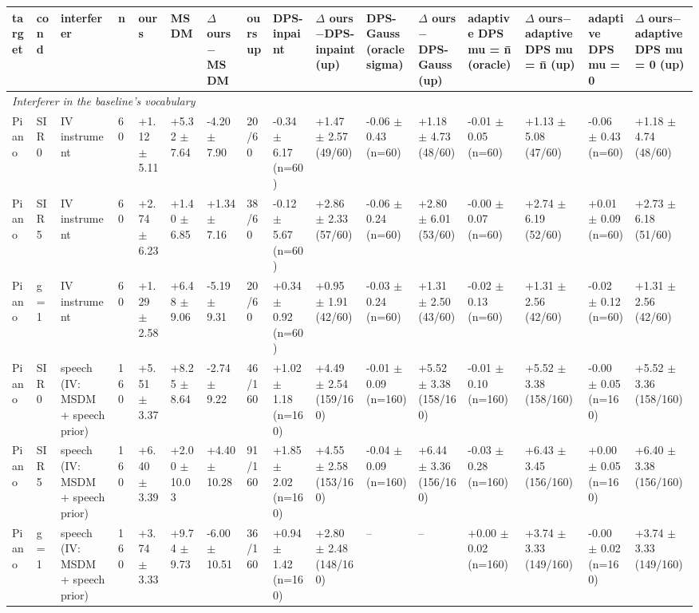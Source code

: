 \begin{tabular}{llllllllllllllll}
\toprule
target & cond & interferer & n & ours & MSDM & $\Delta$ ours$-$MSDM & ours up & DPS-inpaint & $\Delta$ ours$-$DPS-inpaint (up) & DPS-Gauss (oracle sigma) & $\Delta$ ours$-$DPS-Gauss (up) & adaptive DPS mu = n̄ (oracle) & $\Delta$ ours$-$adaptive DPS mu = n̄ (up) & adaptive DPS mu = 0 & $\Delta$ ours$-$adaptive DPS mu = 0 (up)\\
\midrule
\multicolumn{16}{l}{\emph{Interferer in the baseline's vocabulary}}\\
Piano & SIR 0 & IV instrument & 60 & +1.12 $\pm$ 5.11 & +5.32 $\pm$ 7.64 & -4.20 $\pm$ 7.90 & 20/60 & -0.34 $\pm$ 6.17 (n=60) & +1.47 $\pm$ 2.57 (49/60) & -0.06 $\pm$ 0.43 (n=60) & +1.18 $\pm$ 4.73 (48/60) & -0.01 $\pm$ 0.05 (n=60) & +1.13 $\pm$ 5.08 (47/60) & -0.06 $\pm$ 0.43 (n=60) & +1.18 $\pm$ 4.74 (48/60)\\
Piano & SIR 5 & IV instrument & 60 & +2.74 $\pm$ 6.23 & +1.40 $\pm$ 6.85 & +1.34 $\pm$ 7.16 & 38/60 & -0.12 $\pm$ 5.67 (n=60) & +2.86 $\pm$ 2.33 (57/60) & -0.06 $\pm$ 0.24 (n=60) & +2.80 $\pm$ 6.01 (53/60) & -0.00 $\pm$ 0.07 (n=60) & +2.74 $\pm$ 6.19 (52/60) & +0.01 $\pm$ 0.09 (n=60) & +2.73 $\pm$ 6.18 (51/60)\\
Piano & g = 1 & IV instrument & 60 & +1.29 $\pm$ 2.58 & +6.48 $\pm$ 9.06 & -5.19 $\pm$ 9.31 & 20/60 & +0.34 $\pm$ 0.92 (n=60) & +0.95 $\pm$ 1.91 (42/60) & -0.03 $\pm$ 0.24 (n=60) & +1.31 $\pm$ 2.50 (43/60) & -0.02 $\pm$ 0.13 (n=60) & +1.31 $\pm$ 2.56 (42/60) & -0.02 $\pm$ 0.12 (n=60) & +1.31 $\pm$ 2.56 (42/60)\\
Piano & SIR 0 & speech (IV: MSDM + speech prior) & 160 & +5.51 $\pm$ 3.37 & +8.25 $\pm$ 8.64 & -2.74 $\pm$ 9.22 & 46/160 & +1.02 $\pm$ 1.18 (n=160) & +4.49 $\pm$ 2.54 (159/160) & -0.01 $\pm$ 0.09 (n=160) & +5.52 $\pm$ 3.38 (158/160) & -0.01 $\pm$ 0.10 (n=160) & +5.52 $\pm$ 3.38 (158/160) & -0.00 $\pm$ 0.05 (n=160) & +5.52 $\pm$ 3.36 (158/160)\\
Piano & SIR 5 & speech (IV: MSDM + speech prior) & 160 & +6.40 $\pm$ 3.39 & +2.00 $\pm$ 10.03 & +4.40 $\pm$ 10.28 & 91/160 & +1.85 $\pm$ 2.02 (n=160) & +4.55 $\pm$ 2.58 (153/160) & -0.04 $\pm$ 0.09 (n=160) & +6.44 $\pm$ 3.36 (156/160) & -0.03 $\pm$ 0.28 (n=160) & +6.43 $\pm$ 3.45 (156/160) & +0.00 $\pm$ 0.05 (n=160) & +6.40 $\pm$ 3.38 (156/160)\\
Piano & g = 1 & speech (IV: MSDM + speech prior) & 160 & +3.74 $\pm$ 3.33 & +9.74 $\pm$ 9.73 & -6.00 $\pm$ 10.51 & 36/160 & +0.94 $\pm$ 1.42 (n=160) & +2.80 $\pm$ 2.48 (148/160) & -- & -- & +0.00 $\pm$ 0.02 (n=160) & +3.74 $\pm$ 3.33 (149/160) & -0.00 $\pm$ 0.02 (n=160) & +3.74 $\pm$ 3.33 (149/160)\\

\end{tabular}
